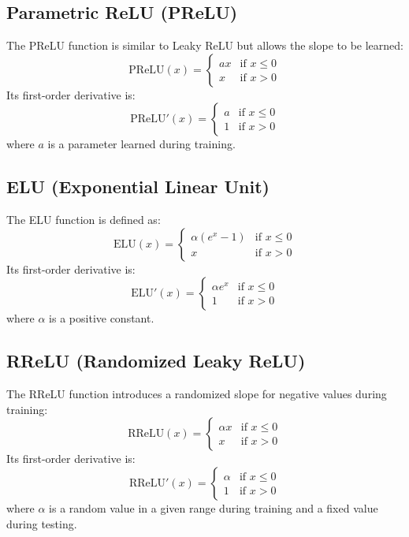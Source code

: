 \documentclass{article}
\begin{document}
\subsection{Parametric ReLU (PReLU)}
The PReLU function is similar to Leaky ReLU but allows the slope to be learned:
\begin{equation}
\text{PReLU}(x) = 
\begin{cases} 
a x & \text{if } x \leq 0 \\
x & \text{if } x > 0 
\end{cases}
\end{equation}
Its first-order derivative is:
\begin{equation}
\text{PReLU}'(x) = 
\begin{cases} 
a & \text{if } x \leq 0 \\
1 & \text{if } x > 0 
\end{cases}
\end{equation}
where \( a \) is a parameter learned during training.

\subsection{ELU (Exponential Linear Unit)}
The ELU function is defined as:
\begin{equation}
\text{ELU}(x) = 
\begin{cases} 
\alpha (e^x - 1) & \text{if } x \leq 0 \\
x & \text{if } x > 0 
\end{cases}
\end{equation}
Its first-order derivative is:
\begin{equation}
\text{ELU}'(x) = 
\begin{cases} 
\alpha e^x & \text{if } x \leq 0 \\
1 & \text{if } x > 0 
\end{cases}
\end{equation}
where \( \alpha \) is a positive constant.

\subsection{RReLU (Randomized Leaky ReLU)}
The RReLU function introduces a randomized slope for negative values during training:
\begin{equation}
\text{RReLU}(x) = 
\begin{cases} 
\alpha x & \text{if } x \leq 0 \\
x & \text{if } x > 0 
\end{cases}
\end{equation}
Its first-order derivative is:
\begin{equation}
\text{RReLU}'(x) = 
\begin{cases} 
\alpha & \text{if } x \leq 0 \\
1 & \text{if } x > 0 
\end{cases}
\end{equation}
where \( \alpha \) is a random value in a given range during training and a fixed value during testing.
\end{document}
